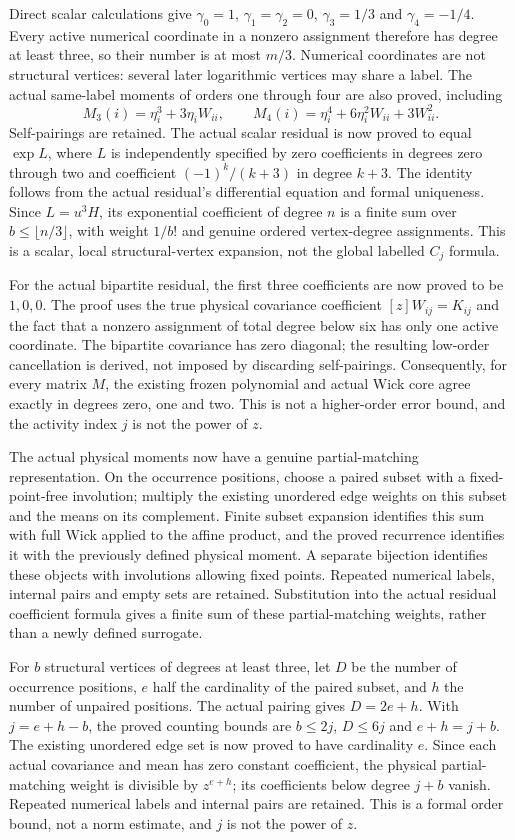 \documentclass[11pt]{article}
\begin{document}
Direct scalar calculations give $\gamma_0=1$, $\gamma_1=\gamma_2=0$, $\gamma_3=1/3$ and $\gamma_4=-1/4$. Every active numerical coordinate in a nonzero assignment therefore has degree at least three, so their number is at most $m/3$. Numerical coordinates are not structural vertices: several later logarithmic vertices may share a label. The actual same-label moments of orders one through four are also proved, including
\[
 M_3(i)=\eta_i^3+3\eta_iW_{ii},\qquad
 M_4(i)=\eta_i^4+6\eta_i^2W_{ii}+3W_{ii}^2.
\]
Self-pairings are retained. The actual scalar residual is now proved to equal $\exp L$, where $L$ is independently specified by zero coefficients in degrees zero through two and coefficient $(-1)^k/(k+3)$ in degree $k+3$. The identity follows from the actual residual's differential equation and formal uniqueness. Since $L=u^3H$, its exponential coefficient of degree $n$ is a finite sum over $b\le\lfloor n/3\rfloor$, with weight $1/b!$ and genuine ordered vertex-degree assignments. This is a scalar, local structural-vertex expansion, not the global labelled $C_j$ formula.

For the actual bipartite residual, the first three coefficients are now proved to be $1,0,0$. The proof uses the true physical covariance coefficient $[z]W_{ij}=K_{ij}$ and the fact that a nonzero assignment of total degree below six has only one active coordinate. The bipartite covariance has zero diagonal; the resulting low-order cancellation is derived, not imposed by discarding self-pairings. Consequently, for every matrix $M$, the existing frozen polynomial and actual Wick core agree exactly in degrees zero, one and two. This is not a higher-order error bound, and the activity index $j$ is not the power of $z$.

The actual physical moments now have a genuine partial-matching representation. On the occurrence positions, choose a paired subset with a fixed-point-free involution; multiply the existing unordered edge weights on this subset and the means on its complement. Finite subset expansion identifies this sum with full Wick applied to the affine product, and the proved recurrence identifies it with the previously defined physical moment. A separate bijection identifies these objects with involutions allowing fixed points. Repeated numerical labels, internal pairs and empty sets are retained. Substitution into the actual residual coefficient formula gives a finite sum of these partial-matching weights, rather than a newly defined surrogate.

For $b$ structural vertices of degrees at least three, let $D$ be the number of occurrence positions, $e$ half the cardinality of the paired subset, and $h$ the number of unpaired positions. The actual pairing gives $D=2e+h$. With $j=e+h-b$, the proved counting bounds are $b\le2j$, $D\le6j$ and $e+h=j+b$. The existing unordered edge set is now proved to have cardinality $e$. Since each actual covariance and mean has zero constant coefficient, the physical partial-matching weight is divisible by $z^{e+h}$; its coefficients below degree $j+b$ vanish. Repeated numerical labels and internal pairs are retained. This is a formal order bound, not a norm estimate, and $j$ is not the power of $z$.
\end{document}
